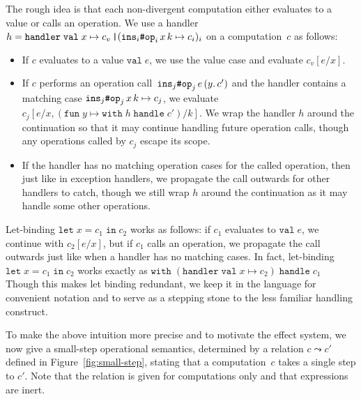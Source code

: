 \documentclass{LMCS}
\newcommand{\step}{\leadsto}
\newcommand{\kop}[1]{\;\mathtt{#1}\;}
\newcommand{\kpre}[1]{\mathtt{#1}\;}
\newcommand{\case}{\mathop{\text{\texttt{|}}}}
\newcommand{\cont}[2]{(#1.\,#2)}
\newcommand{\fun}[1]{\kpre{fun} #1 \mapsto}
\newcommand{\handler}{\kpre{handler}}
\newcommand{\hash}[2]{#1\text{\texttt{\char35}}#2}
\newcommand{\letin}[1]{\kpre{let} #1 \kop{in}}
\newcommand{\call}[4]{{\hash{#1}{#2}\,{#3}\, #4}}
\newcommand{\op}{\mathtt{op}}
\newcommand{\inst}{\mathtt{ins}}
\newcommand{\val}{\kpre{val}}
\newcommand{\withhandle}[2]{\kpre{with} #1 \kop{handle} #2}
\begin{document}
The rough idea is that each non-divergent computation either evaluates to a value or calls an operation.
We use a handler~$h = \handler \val x \mapsto c_v \case (\call{\inst_i}{\op_i}{x}{k} \mapsto c_i)_i$ on a computation~$c$ as follows:
\begin{itemize}
\item
  If $c$ evaluates to a value $\val e$, we use the value case and evaluate $c_v[e / x]$.
\item
  If $c$ performs an operation call~$\call{\inst_j}{\op_j}{e}{\cont{y}{c'}}$
  and the handler contains a matching case $\call{\inst_j}{\op_j}{x}{k} \mapsto c_j$,
  we evaluate $c_j[e / x, (\fun{y} \withhandle{h}{c'}) / k]$.
  We wrap the handler $h$ around the continuation so that it may continue handling future operation calls,
  though any operations called by $c_j$ escape its scope.
\item
  If the handler has no matching operation cases for the called operation,
  then just like in exception handlers,
  we propagate the call outwards for other handlers to catch,
  though we still wrap $h$ around the continuation as it may handle some other operations.
\end{itemize}

\noindent Let-binding $\letin{x = c_1} c_2$ works as follows:
if $c_1$ evaluates to $\val e$, we continue with $c_2[e / x]$,
but if $c_1$ calls an operation,
we propagate the call outwards just like when a handler has no matching cases.
In fact, let-binding $\letin{x = c_1} c_2$ works exactly as
$\withhandle{(\handler \val x \mapsto c_2)}{c_1}$
Though this makes let binding redundant,
we keep it in the language for convenient notation and
to serve as a stepping stone to the less familiar handling construct.

To make the above intuition more precise and to motivate the effect system,
we now give a small-step operational semantics,
determined by a relation $c \step c'$ defined in Figure~\ref{fig:small-step},
stating that a computation~$c$ takes a single step to $c'$.
Note that the relation is given for computations only and that expressions are inert.
\end{document}
